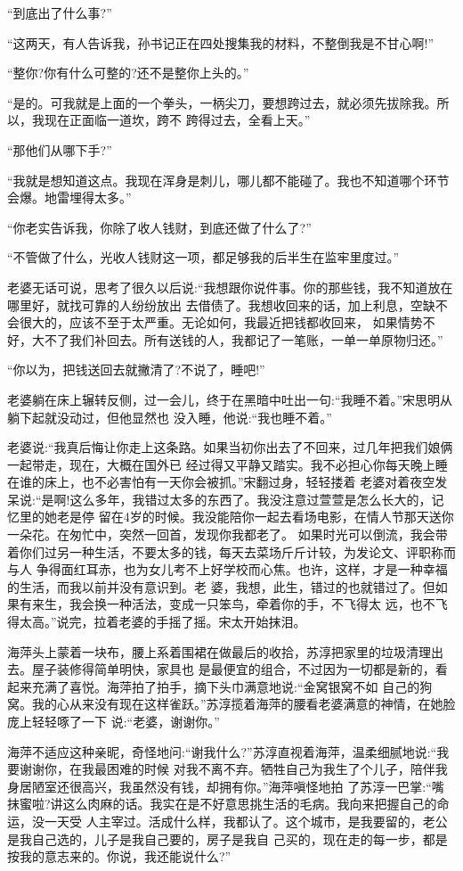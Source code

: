 \documentclass[11pt,a4paper,onecolumn]{article}
\begin{document}
``到底出了什么事?''

``这两天，有人告诉我，孙书记正在四处搜集我的材料，不整倒我是不甘心啊!''

``整你?你有什么可整的?还不是整你上头的。''

``是的。可我就是上面的一个拳头，一柄尖刀，要想跨过去，就必须先拔除我。所以，我现在正面临一道坎，跨不
跨得过去，全看上天。''

``那他们从哪下手?''

``我就是想知道这点。我现在浑身是刺儿，哪儿都不能碰了。我也不知道哪个环节会爆。地雷埋得太多。''

``你老实告诉我，你除了收人钱财，到底还做了什么了?''

``不管做了什么，光收人钱财这一项，都足够我的后半生在监牢里度过。''

老婆无话可说，思考了很久以后说:``我想跟你说件事。你的那些钱，我不知道放在哪里好，就找可靠的人纷纷放出
去借债了。我想收回来的话，加上利息，空缺不会很大的，应该不至于太严重。无论如何，我最近把钱都收回来，
如果情势不好，大不了我们补回去。所有送钱的人，我都记了一笔账，一单一单原物归还。''

``你以为，把钱送回去就撇清了?不说了，睡吧!''

老婆躺在床上辗转反侧，过一会儿，终于在黑暗中吐出一句:``我睡不着。''宋思明从躺下起就没动过，但他显然也
没入睡，他说:``我也睡不着。''

老婆说:``我真后悔让你走上这条路。如果当初你出去了不回来，过几年把我们娘俩一起带走，现在，大概在国外已
经过得又平静又踏实。我不必担心你每天晚上睡在谁的床上，也不必害怕有一天你会被抓。''宋翻过身，轻轻搂着
老婆对着夜空发呆说:``是啊!这么多年，我错过太多的东西了。我没注意过萱萱是怎么长大的，记忆里的她老是停
留在4岁的时候。我没能陪你一起去看场电影，在情人节那天送你一朵花。在匆忙中，突然一回首，发现你我都老了。
如果时光可以倒流，我会带着你们过另一种生活，不要太多的钱，每天去菜场斤斤计较，为发论文、评职称而与人
争得面红耳赤，也为女儿考不上好学校而心焦。也许，这样，才是一种幸福的生活，而我以前并没有意识到。老
婆，我想，此生，错过的也就错过了。但如果有来生，我会换一种活法，变成一只笨鸟，牵着你的手，不飞得太
远，也不飞得太高。''说完，拉着老婆的手摇了摇。宋太开始抹泪。

海萍头上蒙着一块布，腰上系着围裙在做最后的收拾，苏淳把家里的垃圾清理出去。屋子装修得简单明快，家具也
是最便宜的组合，不过因为一切都是新的，看起来充满了喜悦。海萍拍了拍手，摘下头巾满意地说:``金窝银窝不如
自己的狗窝。我的心从来没有现在这样雀跃。''苏淳揽着海萍的腰看老婆满意的神情，在她脸庞上轻轻啄了一下
说:``老婆，谢谢你。''

海萍不适应这种亲昵，奇怪地问:``谢我什么?''苏淳直视着海萍，温柔细腻地说:``我要谢谢你，在我最困难的时候
对我不离不弃。牺牲自己为我生了个儿子，陪伴我身居陋室还很高兴，我虽然没有钱，却拥有你。''海萍嗔怪地拍
了苏淳一巴掌:``嘴抹蜜啦?讲这么肉麻的话。我实在是不好意思挑生活的毛病。我向来把握自己的命运，没一天受
人主宰过。活成什么样，我都认了。这个城市，是我要留的，老公是我自己选的，儿子是我自己要的，房子是我自
己买的，现在走的每一步，都是按我的意志来的。你说，我还能说什么?''
\end{document}
